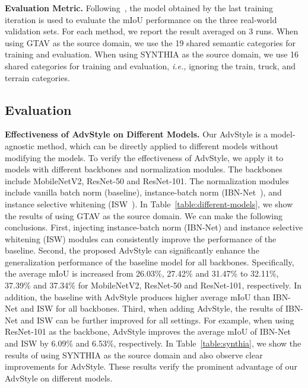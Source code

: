 \documentclass{article}
\newcommand{\ours}{AdvStyle\xspace}
\begin{document}
\textbf{Evaluation Metric.} 
Following~\cite{robustnet}, the model obtained by the last training iteration is used to evaluate the mIoU performance on the three real-world validation sets. For each method, we report the result averaged on 3 runs. When using GTAV as the source domain, we use the 19 shared semantic categories for training and evaluation. When using SYNTHIA as the source domain, we use 16 shared categories for training and evaluation, \textit{i.e.,} ignoring the train, truck, and terrain categories.



\subsection{Evaluation}

\textbf{Effectiveness of \ours on Different Models.} Our \ours is a model-agnostic method, which can be directly applied to different models without modifying the models. To verify the effectiveness of \ours, we apply it to models with different backbones and normalization modules. The backbones include MobileNetV2, ResNet-50 and ResNet-101. The normalization modules include vanilla batch norm (baseline), instance-batch norm (IBN-Net~\cite{ibn}), and instance selective whitening (ISW~\cite{robustnet}).
In Table~\ref{table:different-models}, we show the results of using GTAV as the source domain. 
We can make the following conclusions. First, injecting instance-batch norm (IBN-Net) and instance selective whitening (ISW) modules can consistently improve the performance of the baseline. Second, the proposed \ours can significantly enhance the generalization performance of the baseline model for all backbones. Specifically, the average mIoU is increased from 26.03\%, 27.42\% and 31.47\% to 32.11\%, 37.39\% and 37.34\% for MobileNetV2, ResNet-50 and ResNet-101, respectively. In addition, the baseline with \ours produces higher average mIoU than IBN-Net and ISW for all backbones. Third, when adding \ours, the results of IBN-Net and ISW can be further improved for all settings. For example, when using ResNet-101 as the backbone, \ours improves the average mIoU of IBN-Net and ISW by 6.09\% and 6.53\%, respectively. In Table~\ref{table:synthia}, we show the results of using SYNTHIA as the source domain and also observe clear improvements for \ours. These results verify the prominent advantage of our \ours on different models.
\end{document}
